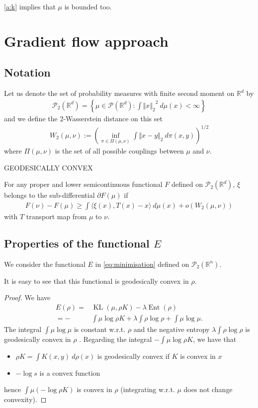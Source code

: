 \documentclass[a4paper]{article}
\theoremstyle{definition}
\DeclareMathOperator{\KL}{KL}
\DeclareMathOperator{\ent}{Ent}
\newcommand{\norm}[2]{\ensuremath{\Vert #1 \Vert_{#2}}}
\def\real{\mathbb{R}}
\begin{document}
\ref{a:k} implies that $\mu$ is bounded too.
\section{Gradient flow approach}
\subsection{Notation}

Let us denote the set of probability measures with finite second moment on $\real^d$ by
\begin{align*}
\mathcal{P}_2(\real^d) = \left\lbrace \mu\in \mathcal{P}(\real^d): \int \norm{ x}{2}^2 \ d\mu(x)< \infty\right\rbrace
\end{align*}
and we define the 2-Wasserstein distance on this set
\begin{align*}
W_2(\mu, \nu) := \left( \inf_{\pi\in\Pi(\mu, \nu)}\int\norm{x - y}{2}\ d\pi(x, y)\right)^{1/2}
\end{align*}
where $\Pi(\mu, \nu)$ is the set of all possible couplings between $\mu$ and $\nu$.

GEODESICALLY CONVEX	

For any proper and lower semicontinuous functional $F$ defined on $\mathcal{P}_2(\real^d)$, $\xi$ belongs to the sub-differential $\partial F(\mu)$ if
\begin{align*}
F(\nu) - F(\mu) \geq \int\langle \xi(x), T(x) - x\rangle\ d\mu(x) +o\left( W_2(\mu, \nu)\right)
\end{align*}
with $T$ transport map from $\mu$ to $\nu$.

\subsection{Properties of the functional $E$}

We consider the functional $E$ in \eqref{eq:minimisation} defined on $\mathcal{P}_2(\real^n)$.

It is easy to see that this functional is geodesically convex in $\rho$.
\begin{proof}
We have
\begin{align*}
E(\rho)= & \KL(\mu,\rho K)-\lambda\ent(\rho)\\
=- & \int\mu\log\rho K+\lambda\int\rho\log\rho+\int\mu\log\mu.
\end{align*}
The integral $\int\mu\log\mu$ is constant w.r.t. $\rho$ and the negative entropy $\lambda\int\rho\log\rho$ is geodesically convex in $\rho$ \citep[page 130]{santambrogio2017euclidean}.
Regarding the integral $- \int\mu\log\rho K$, we have that
\begin{itemize}
\item $\rho K = \int K(x, y) \ d\rho(x)$ is geodesically convex if $K$ is convex in $x$ \citep[page 128]{santambrogio2017euclidean}
\item $-\log s$ is a convex function
\end{itemize}
hence $\int\mu\left( -\log\rho K\right)$ is convex in $\rho$ (integrating w.r.t. $\mu$ does not change convexity).
\end{proof}
\end{document}

